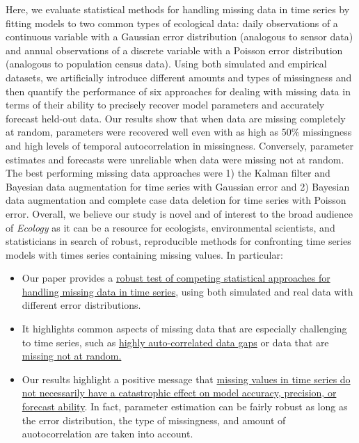 \documentclass{article}
\begin{document}
Here, we evaluate statistical methods for handling missing data in time series by fitting models to two common types of ecological data: daily observations of a continuous variable with a Gaussian error distribution (analogous to sensor data) and annual observations of a discrete variable with a Poisson error distribution (analogous to population census data). Using both simulated and empirical datasets, we artificially introduce different amounts and types of missingness and then quantify the performance of six approaches for dealing with missing data in terms of their ability to precisely recover model parameters and accurately forecast held-out data. Our results show that when data are missing completely at random, parameters were recovered well even with as high as 50\% missingness and high levels of temporal autocorrelation in missingness. Conversely, parameter estimates and forecasts were unreliable when data were missing not at random. The best performing missing data approaches were 1) the Kalman filter and Bayesian data augmentation for time series with Gaussian error and 2) Bayesian data augmentation and complete case data deletion for time series with Poisson error. Overall, we believe our study is novel and of interest to the broad audience of \textit{Ecology} as it can be a resource for ecologists, environmental scientists, and statisticians in search of robust, reproducible methods for confronting time series models with times series containing missing values. In particular:

\vspace{-0.4em}

\begin{itemize} 

\item {Our paper provides a \ul{robust test of competing statistical approaches for handling missing data in time series}, using both simulated and real data with different error distributions.} 

\item {It highlights common aspects of missing data that are especially challenging to time series, such as \ul{highly auto-correlated data gaps} %
or data that are \ul{missing not at random.} %
} 

\item {Our results highlight a positive message that \ul{missing values in time series do not necessarily have a catastrophic effect on model accuracy, precision, or forecast ability}. In fact, parameter estimation can be fairly robust as long as the error distribution, the type of missingness, and amount of auotocorrelation are taken into account.} 

\end{itemize}
\end{document}
